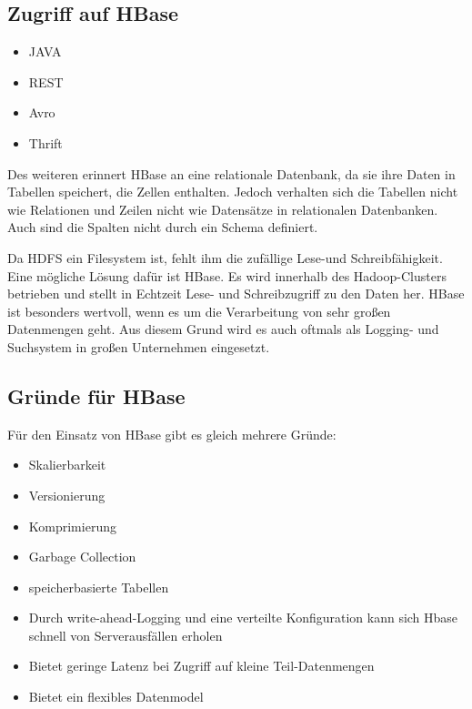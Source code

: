 \subsection{Zugriff auf HBase}
\begin{itemize}

\item JAVA
\item REST
\item Avro
\item Thrift
\end{itemize}



Des weiteren erinnert HBase an eine relationale Datenbank, da sie ihre Daten in Tabellen speichert, die Zellen enthalten. Jedoch verhalten sich die Tabellen nicht wie Relationen und Zeilen nicht wie Datensätze in relationalen Datenbanken. Auch sind die Spalten nicht durch ein Schema definiert.

Da HDFS ein Filesystem ist, fehlt ihm die zufällige Lese-und Schreibfähigkeit. Eine mögliche Lösung dafür ist HBase. Es wird innerhalb des Hadoop-Clusters betrieben und stellt in Echtzeit Lese- und Schreibzugriff zu den Daten her. HBase ist besonders wertvoll, wenn es um die Verarbeitung von sehr großen Datenmengen geht. Aus diesem Grund wird es auch oftmals als Logging- und Suchsystem in großen Unternehmen eingesetzt.

\subsection{Gründe für HBase}
Für den Einsatz von HBase gibt es gleich mehrere Gründe:
\begin{itemize}

\item Skalierbarkeit
\item Versionierung
\item Komprimierung
\item Garbage Collection
\item speicherbasierte Tabellen
\item Durch write-ahead-Logging und eine verteilte Konfiguration kann sich Hbase schnell von Serverausfällen erholen
\item Bietet geringe Latenz bei Zugriff auf kleine Teil-Datenmengen 
\item Bietet ein flexibles Datenmodel
\end{itemize}